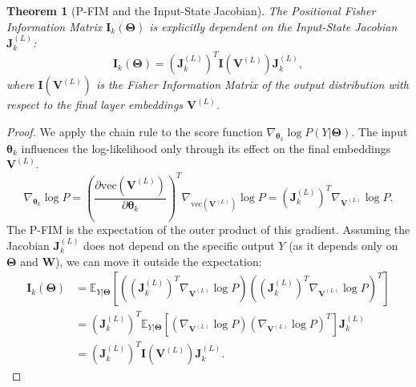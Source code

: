 \documentclass{article}
\newtheorem{theorem}{Theorem}[section]
\theoremstyle{definition}
\begin{document}
\begin{theorem}[P-FIM and the Input-State Jacobian]
\label{thm:pfim_jacobian}
The Positional Fisher Information Matrix $\mathbf{I}_k(\mathbf{\Theta})$ is explicitly dependent on the Input-State Jacobian $\mathbf{J}_k^{(L)}$:
\begin{equation}
    \mathbf{I}_k(\mathbf{\Theta}) = (\mathbf{J}_k^{(L)})^T \mathbf{I}(\mathbf{V}^{(L)}) \mathbf{J}_k^{(L)},
\end{equation}
where $\mathbf{I}(\mathbf{V}^{(L)})$ is the Fisher Information Matrix of the output distribution with respect to the final layer embeddings $\mathbf{V}^{(L)}$.
\end{theorem}
\begin{proof}
We apply the chain rule to the score function $\nabla_{\boldsymbol{\theta}_k} \log P(Y|\mathbf{\Theta})$. The input $\boldsymbol{\theta}_k$ influences the log-likelihood only through its effect on the final embeddings $\mathbf{V}^{(L)}$.
\begin{equation}
    \nabla_{\boldsymbol{\theta}_k} \log P = \left( \frac{\partial \text{vec}(\mathbf{V}^{(L)})}{\partial \boldsymbol{\theta}_k} \right)^T \nabla_{\text{vec}(\mathbf{V}^{(L)})} \log P = (\mathbf{J}_k^{(L)})^T \nabla_{\mathbf{V}^{(L)}} \log P.
\end{equation}
The P-FIM is the expectation of the outer product of this gradient. Assuming the Jacobian $\mathbf{J}_k^{(L)}$ does not depend on the specific output $Y$ (as it depends only on $\mathbf{\Theta}$ and $\mathbf{W}$), we can move it outside the expectation:
\begin{align}
    \mathbf{I}_k(\mathbf{\Theta}) &= \mathbb{E}_{Y|\mathbf{\Theta}} \left[ ((\mathbf{J}_k^{(L)})^T \nabla_{\mathbf{V}^{(L)}} \log P) ((\mathbf{J}_k^{(L)})^T \nabla_{\mathbf{V}^{(L)}} \log P)^T \right] \\
    &= (\mathbf{J}_k^{(L)})^T \mathbb{E}_{Y|\mathbf{\Theta}} \left[ (\nabla_{\mathbf{V}^{(L)}} \log P) (\nabla_{\mathbf{V}^{(L)}} \log P)^T \right] \mathbf{J}_k^{(L)} \\
    &= (\mathbf{J}_k^{(L)})^T \mathbf{I}(\mathbf{V}^{(L)}) \mathbf{J}_k^{(L)}.
\end{align}
\end{proof}
\end{document}
